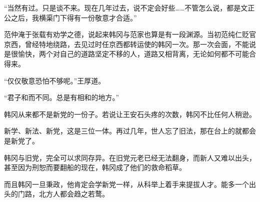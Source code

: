 “当然有过。只是谈不来。现在几年过去，说不定会好些……不管怎么说，都是文正公之后，我横渠门下得有一份敬意才合适。”

范仲淹于张载有劝学之德，说起来韩冈与范家也算是有一段渊源。当初范纯仁贬官京西，曾经特地绕路，去见过时任京西都转运使的韩冈一次。那一次会面，不能说是很愉快，两个对自己的道路坚定不移的人，道路又相背离，无论如何都不可能合得来。

“仅仅敬意恐怕不够呢。”王厚道。

“君子和而不同。总是有相和的地方。”

韩冈从来都不是新党的一份子。若说让王安石头疼的次数，韩冈不比任何人稍逊。

新学、新法、新党，这是三位一体。再过几年，世人忘了旧法，那在台上的就都会是新党了。

韩冈与旧党，完全可以求同存异。在旧党元老已经无法翻身，而新人又难以出头，甚至因为刑恕而要翻船的现在，韩冈成了他们的救命稻草。

而且韩冈一旦秉政，他肯定会学新党一样，从科举上着手来提拔人才。能多一个出头的门路，北方人都会趋之若鹜。

